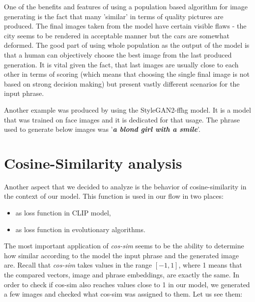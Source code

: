 \documentclass[12pt,a4paper,openany]{book}
\begin{document}
\noindent One of the benefits and features of using a population based algorithm for image generating is the fact that many 'similar' in terms of quality pictures are produced. The final images taken from the model have certain visible flaws - the city seems to be rendered in acceptable manner but the cars are somewhat deformed. The good part of using whole population as the output of the model is that a human can objectively choose the best image from the last produced generation. It is vital given the fact, that last images are usually close to each other in terms of scoring (which means that choosing the single final image is not based on strong decision making) but present vastly different scenarios for the input phrase.

\noindent Another example was produced by using the StyleGAN2-ffhg model. It is a model that was trained on face images and it is dedicated for that usage. The phrase used to generate below images was '\textit{\textbf{a blond girl with a smile}}'.
\newpage
\section{Cosine-Similarity analysis}
\noindent Another aspect that we decided to analyze is the behavior of cosine-similarity in the context of our model. This function is used in our flow in two places:
\begin{itemize}
\item  as loss function in CLIP model,
\item as loss function in evolutionary algorithms.
\end{itemize}
\noindent The most important application of \textit{cos-sim} seems to be the ability to determine how similar according to the model the input phrase and the generated image are. Recall that \textit{cos-sim }takes values in the range $[-1,1]$, where 1 means that the compared vectors, image and phrase embeddings, are exactly the same. In order to check if cos-sim also reaches values close to 1 in our model, we generated a few images and checked what cos-sim was assigned to them. Let us see them: 
\end{document}

